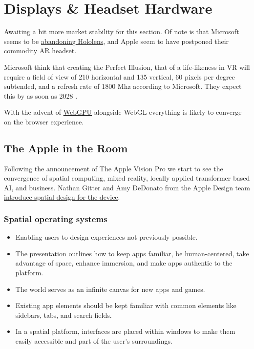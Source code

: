 \section{Displays \& Headset Hardware}
Awaiting a bit more market stability for this section. Of note is that Microsoft seems to be \href{https://www.windowscentral.com/microsoft/microsoft-has-laid-off-entire-teams-behind-virtual-mixed-reality-and-hololens}{abandoning Hololens}, and Apple seem to have postponed their commodity AR headset. \par
Microsoft think that creating the Perfect Illusion, that of a life-likeness in VR will require a field of view of 210 horizontal and  135 vertical, 60 pixels per degree subtended, and a refresh rate of 1800 Mhz according to Microsoft. They expect this by as soon as 2028 \cite{cuervo2018creating}.\par 
With the advent of \href{https://developer.chrome.com/docs/web-platform/webgpu/}{WebGPU} alongside WebGL everything is likely to converge on the browser experience.

\subsection{The Apple in the Room}
Following the announcement of The Apple Vision Pro we start to see the convergence of spatial computing, mixed reality, locally applied transformer based AI, and business.  Nathan Gitter and Amy DeDonato from the Apple Design team \href{https://developer.apple.com/videos/play/wwdc2023/10072/}{introduce spatial design for the device}.
\subsubsection{Spatial operating systems}
\begin{itemize}
\item Enabling users to design experiences not previously possible.
\item The presentation outlines how to keep apps familiar, be human-centered, take advantage of space, enhance immersion, and make apps authentic to the platform.
\item The world serves as an infinite canvas for new apps and games.
\item Existing app elements should be kept familiar with common elements like sidebars, tabs, and search fields.
\item In a spatial platform, interfaces are placed within windows to make them easily accessible and part of the user's surroundings.
\end{itemize}
